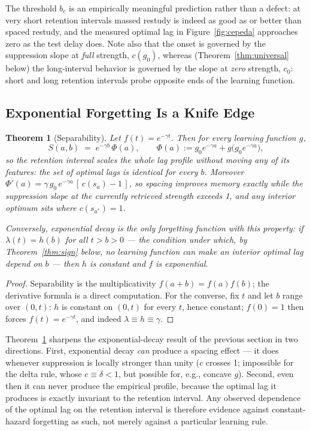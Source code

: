 \documentclass[man, 12pt, floatsintext]{apa6}
\newtheorem{theorem}{Theorem}
\theoremstyle{definition}
\theoremstyle{remark}
\begin{document}
The threshold $b_c$ is an empirically meaningful prediction rather than a defect: at very short retention intervals massed restudy is indeed as good as or better than spaced restudy, and the measured optimal lag in Figure~\ref{fig:cepeda} approaches zero as the test delay does. Note also that the onset is governed by the suppression slope at \emph{full} strength, $c(g_0)$, whereas (Theorem~\ref{thm:universal} below) the long-interval behavior is governed by the slope at \emph{zero} strength, $c_0$: short and long retention intervals probe opposite ends of the learning function.

\subsection{Exponential Forgetting Is a Knife Edge}

\begin{theorem}[Separability]\label{thm:exp}
Let $f(t) = e^{-\gamma t}$. Then for every learning function $g$,
\begin{equation}
  S(a,b) \;=\; e^{-\gamma b}\, \Phi(a), \qquad \Phi(a) := g_0 e^{-\gamma a} + g\!\big(g_0 e^{-\gamma a}\big),
\end{equation}
so the retention interval scales the whole lag profile without moving any of its features: the set of optimal lags is \emph{identical for every $b$}. Moreover $\Phi'(a) = \gamma\, g_0\, e^{-\gamma a}\,[\,c(s_a) - 1\,]$, so spacing improves memory exactly while the suppression slope at the currently retrieved strength exceeds 1, and any interior optimum sits where $c(s_{a^*}) = 1$.

Conversely, exponential decay is the only forgetting function with this property: if $\lambda(t) = h(b)$ for all $t > b > 0$ --- the condition under which, by Theorem~\ref{thm:sign} below, no learning function can make an interior optimal lag depend on $b$ --- then $h$ is constant and $f$ is exponential.
\end{theorem}

\begin{proof}
Separability is the multiplicativity $f(a+b) = f(a)f(b)$; the derivative formula is a direct computation. For the converse, fix $t$ and let $b$ range over $(0,t)$: $h$ is constant on $(0,t)$ for every $t$, hence constant; $f(0)=1$ then forces $f(t) = e^{-\gamma t}$, and indeed $\lambda \equiv h \equiv \gamma$.
\end{proof}

Theorem~\ref{thm:exp} sharpens the exponential-decay result of the previous section in two directions. First, exponential decay \emph{can} produce a spacing effect --- it does whenever suppression is locally stronger than unity ($c$ crosses 1; impossible for the delta rule, whose $c\equiv\delta<1$, but possible for, e.g., concave $g$). Second, even then it can never produce the empirical profile, because the optimal lag it produces is exactly invariant to the retention interval. Any observed dependence of the optimal lag on the retention interval is therefore evidence against constant-hazard forgetting as such, not merely against a particular learning rule.
\end{document}
